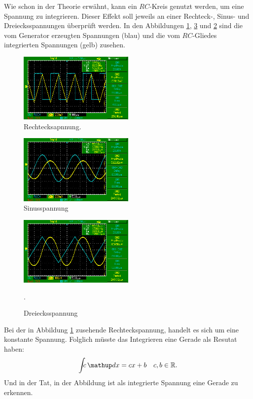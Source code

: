 Wie schon in der Theorie erwähnt, kann ein $RC$-Kreis genutzt werden, um eine
Spannung zu integrieren.
Dieser Effekt soll jeweils an einer Rechteck-, Sinus- und Dreiecksspannungen
überprüft werden.
In den Abbildungen \ref{fig:rechteck}, \ref{fig:dreieck} und \ref{fig:sinus} sind die vom
Generator erzeugten Spannungen (blau) und die vom $RC$-Gliedes integrierten Spannungen
(gelb) zusehen.
\FloatBarrier
\begin{figure}
  \centering
  \includegraphics[width=0.5\textwidth]{pics/teild_rechteckspannung.png}
  \caption{Rechtecksapnnung.}
  \label{fig:rechteck}
\end{figure}
\begin{figure}
  \centering
  \includegraphics[width=0.5\textwidth]{pics/bildd_sinus.png}
  \caption{Sinusspannung}
  \label{fig:sinus}
\end{figure}
\begin{figure}
  \centering
  \includegraphics[width=0.5\textwidth]{pics/teild_dreieck.png}
  \caption{Dreiecksspannung}.
  \label{fig:dreieck}
\end{figure}
\FloatBarrier

Bei der in Abbildung \ref{fig:rechteck} zusehende Rechteckspannung,
handelt es sich um eine konstante Spannung. Folglich müsste das Integrieren
eine Gerade als Resutat haben:
\begin{equation*}
   \int\!\!\!c \dv{x}= cx+b \quad c,b\in\mathbb{R}.
\end{equation*}
Und in der Tat, in der Abbildung ist als integrierte Spannung eine Gerade zu erkennen.

